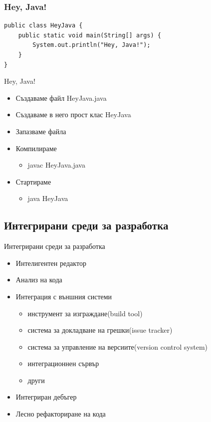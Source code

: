 \documentclass{beamer}
\begin{document}
\begin{frame}[fragile]
  \frametitle{Hey, Java!}
  \transdissolve
\begin{lstlisting}
public class HeyJava {
    public static void main(String[] args) {
        System.out.println("Hey, Java!");
    }
}
\end{lstlisting}
\end{frame}

\begin{frame}{Hey, Java!}
  \transdissolve  
  \begin{itemize}
    \item Създаваме файл HeyJava.java
    \item Създаваме в него прост клас HeyJava
    \item Запазваме файла
    \item Компилираме
      \begin{itemize}
        \item javac HeyJava.java
      \end{itemize}
    \item Стартираме
      \begin{itemize}
      \item java HeyJava
      \end{itemize}
  \end{itemize}
\end{frame}

\subsection{Интегрирани среди за разработка}
\begin{frame}{Интегрирани среди за разработка}
  \transdissolve  
  \begin{itemize}
    \item Интелигентен редактор
    \item Анализ на кода
    \item Интеграция с външния системи
      \begin{itemize}
        \item инструмент за изграждане(build tool)
        \item система за докладване на грешки(issue tracker)
        \item система за управление на версиите(version control
          system)
        \item интеграционнен сървър
        \item други
      \end{itemize}
    \item Интегриран дебъгер
    \item Лесно рефакториране на кода
  \end{itemize}
\end{frame}
\end{document}
